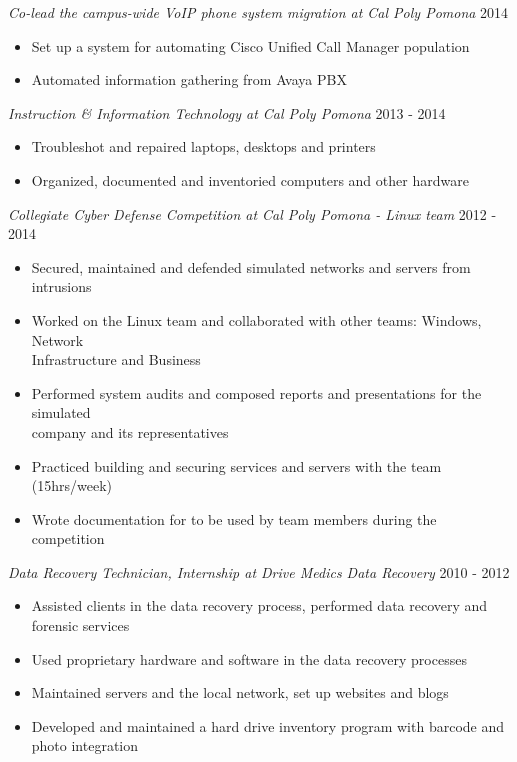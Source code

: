\documentclass[line]{docs/resume/res}
\begin{document}
\begin{resume}
  {\sl Co-lead the campus-wide VoIP phone system migration at Cal Poly Pomona} \hfill 2014
  \begin{itemize} \itemsep -2pt
    \item Set up a system for automating Cisco Unified Call Manager population
    \item Automated information gathering from Avaya PBX
  \end{itemize}

  {\sl Instruction \& Information Technology at Cal Poly Pomona} \hfill 2013 - 2014
  \begin{itemize} \itemsep -2pt
    \item Troubleshot and repaired laptops, desktops and printers
    \item Organized, documented and inventoried computers and other hardware
  \end{itemize}

  {\sl Collegiate Cyber Defense Competition at Cal Poly Pomona - Linux team} \hfill 2012 - 2014
  \begin{itemize} \itemsep -2pt
    \item Secured, maintained and defended simulated networks and servers from intrusions
    \item Worked on the Linux team and collaborated with other teams: Windows, Network \\
      Infrastructure and Business
    \item Performed system audits and composed reports and presentations for the simulated \\
      company and its representatives
    \item Practiced building and securing services and servers with the team (15hrs/week)
    \item Wrote documentation for to be used by team members during the competition
  \end{itemize}

  {\sl Data Recovery Technician, Internship at Drive Medics Data Recovery} \hfill 2010 - 2012
  \begin{itemize} \itemsep -2pt
    \item Assisted clients in the data recovery process, performed data recovery and \\
      forensic services
    \item Used proprietary hardware and software in the data recovery processes
    \item Maintained servers and the local network, set up websites and blogs
    \item Developed and maintained a hard drive inventory program with barcode and \\
      photo integration
  \end{itemize}


\end{resume}
\end{document}
